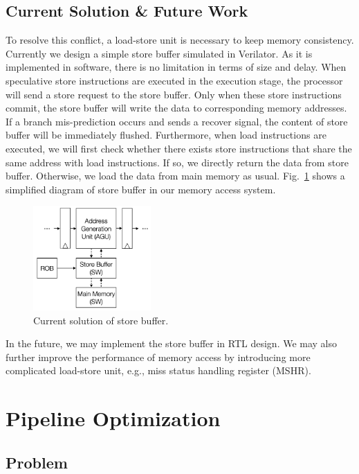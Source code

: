 \subsection{Current Solution \& Future Work}
To resolve this conflict, a load-store unit is necessary to keep memory consistency. Currently we design a simple store buffer simulated in Verilator. As it is implemented in software, there is no limitation in terms of size and delay. When speculative store instructions are executed in the execution stage, the processor will send a store request to the store buffer. Only when these store instructions commit, the store buffer will write the data to corresponding memory addresses. If a branch mis-prediction occurs and sends a recover signal, the content of store buffer will be immediately flushed. Furthermore, when load instructions are executed, we will first check whether there exists store instructions that share the same address with load instructions. If so, we directly return the data from store buffer. Otherwise, we load the data from main memory as usual. Fig.~\ref{fig:store-buffer} shows a simplified diagram of store buffer in our memory access system.

\begin{figure}[!htp]
    \centering
    \includegraphics[width=0.4\textwidth]{figure/store_buffer.png}
    \caption{Current solution of store buffer.}
    \label{fig:store-buffer}
\end{figure}

In the future, we may implement the store buffer in RTL design. We may also further improve the performance of memory access by introducing more complicated load-store unit, e.g., miss status handling register (MSHR).


\section{Pipeline Optimization}
\subsection{Problem}

